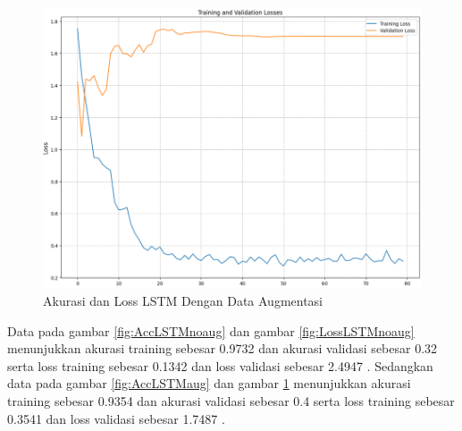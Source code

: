 \begin{figure} [H] \centering
  \includegraphics[scale=0.6]{gambar/LossLSTMaug.png}
  \caption{Akurasi dan Loss LSTM Dengan Data Augmentasi}
  \label{fig:LossLSTMaug}
\end{figure}

Data pada gambar \ref{fig:AccLSTMnoaug} dan gambar \ref{fig:LossLSTMnoaug} menunjukkan akurasi training sebesar 0.9732
dan akurasi validasi sebesar 0.32 serta loss training sebesar 0.1342 dan loss validasi
sebesar 2.4947 . Sedangkan data pada gambar \ref{fig:AccLSTMaug} dan gambar \ref{fig:LossLSTMaug}
menunjukkan akurasi training sebesar 0.9354 dan akurasi validasi sebesar 0.4
serta loss training sebesar 0.3541 dan loss validasi sebesar 1.7487 .

